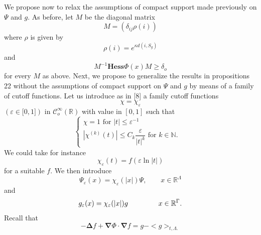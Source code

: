 \documentclass{article}
\begin{document}
We propose now to relax the assumptions of compact support made previously
on $\Psi $ and $g.$ As before, let $M$ be the diagonal matrix%
\begin{equation*}
M=\left( \delta _{ij}\rho (i)\right)
\end{equation*}%
where $\rho $ is given by \ 
\begin{equation}
\rho \left( i\right) =e^{\kappa d(i,S_{g})}
\end{equation}%
and 
\begin{equation}
M^{-1}\mathbf{Hess}\Phi (x)M\geq \delta _{o}
\end{equation}%
for every $M$ as above. Next, we propose to generalize the results in
propositions 22 without the assumptions of compact support on $\Psi $ and $g$
by means of a family of cutoff functions. Let us introduce as in [8] a
family cutoff functions 
\begin{equation}
\chi =\chi _{\varepsilon }
\end{equation}%
$(\varepsilon \in \lbrack 0,1])$ in $\mathcal{C}_{o}^{\infty }(\mathbb{R})$
with value in $[0,1]$ such that%
\begin{equation*}
\left\{ 
\begin{array}{c}
\chi =1\text{ \ \ \ \ \ \ \ \ \ \ \ \ \ \ \ \ for }\left| t\right| \leq
\varepsilon ^{-1}\text{ } \\ 
\left| \chi ^{(k)}(t)\right| \leq C_{k}\dfrac{\varepsilon }{\left| t\right|
^{k}}\text{ \ \ \ \ \ \ \ \ \ \ \ \ \ \ \ \ for }k\in \mathbb{N}.\mathbb{\ }%
\text{\ \ \ \ \ \ \ \ \ \ \ \ \ \ \ \ \ \ \ \ \ \ \ }%
\end{array}%
\right.
\end{equation*}%
We could take for instance%
\begin{equation*}
\chi _{\varepsilon }(t)=f(\varepsilon \ln \left| t\right| )
\end{equation*}%
for a suitable $f$. We then introduce%
\begin{equation}
\Psi _{\varepsilon }(x)=\chi _{\varepsilon }(\left| x\right| )\Psi ,\ \ \ \
\ \ \ \ \ x\in \mathbb{R}^{\Lambda }
\end{equation}%
and 
\begin{equation}
g_{\varepsilon }(x)=\chi _{\varepsilon }(\left| x\right| )g\text{ \ \ \ \ \
\ \ \ \ \ \ \ }x\in \mathbb{R}^{\Gamma }\text{.}
\end{equation}%
Recall that 
\begin{equation}
-\mathbf{\Delta }f+\mathbf{\nabla }\Phi \cdot \mathbf{\nabla }%
f=g-<g>_{t,\Lambda .}
\end{equation}%
\end{document}
